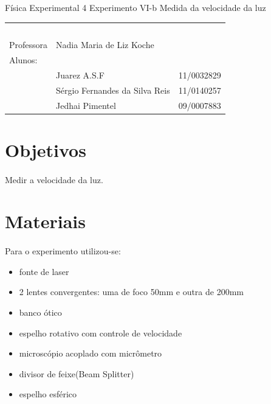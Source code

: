 \documentclass[a4paper,11pt]{article}
\begin{document}
\MakeMyTitlePage
{Física Experimental 4}
{Experimento VI-b}
{Medida da velocidade da luz}
{%
		\begin{tabular}{llr} \
		& & \\[0.05cm]		
		Professora & Nadia Maria de Liz Koche & \\
		
		Alunos:& & \\
		& Juarez A.S.F 					& 11/0032829\\
		& Sérgio Fernandes da Silva Reis & 11/0140257\\
		& Jedhai Pimentel				& 09/0007883\\
	[0.05cm]	
		\end{tabular}
}

\section{Objetivos}
\paragraph{}Medir a velocidade da luz. 
\section{Materiais}
\paragraph{} Para o experimento utilizou-se:
\begin{itemize}
  \item fonte de laser 
  \item 2 lentes convergentes: uma de foco 50mm e outra de
    200mm 
  \item banco ótico
  \item espelho rotativo com controle de velocidade
  \item microscópio acoplado com micrômetro
  \item divisor de feixe(Beam Splitter)
  \item espelho esférico
\end{itemize}
\newpage
\end{document}
